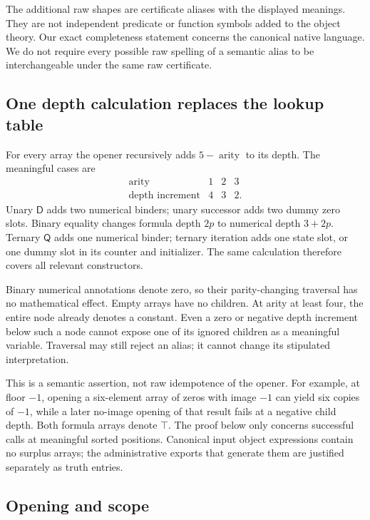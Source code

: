 \documentclass[11pt,letterpaper]{article}
\theoremstyle{definition}\newtheorem{definition}[theorem]{Definition}
\theoremstyle{remark}\newtheorem{remark}[theorem]{Remark}
\newcommand{\D}{\mathsf D}
\newcommand{\Q}{\mathsf Q}
\begin{document}
The additional raw shapes are certificate aliases with the displayed
meanings.  They are not independent predicate or function symbols added
to the object theory.  Our exact completeness statement concerns the
canonical native language.  We do not require every possible raw spelling
of a semantic alias to be interchangeable under the same raw certificate.

\subsection{One depth calculation replaces the lookup table}

For every array the opener recursively adds $5-\operatorname{arity}$
to its depth.  The meaningful cases are
\[
\begin{array}{c|ccc}
 \operatorname{arity}&1&2&3\\\hline
 \text{depth increment}&4&3&2.
\end{array}
\]
Unary $\D$ adds two numerical binders; unary successor adds two dummy
zero slots.  Binary equality changes formula depth $2p$ to numerical
depth $3+2p$.  Ternary $\Q$ adds one numerical binder; ternary iteration
adds one state slot, or one dummy slot in its counter and initializer.
The same calculation therefore covers all relevant constructors.

Binary numerical annotations denote zero, so their parity-changing
traversal has no mathematical effect.  Empty arrays have no children.
At arity at least four, the entire node already denotes a constant.
Even a zero or negative depth increment below such a node cannot expose
one of its ignored children as a meaningful variable.  Traversal may
still reject an alias; it cannot change its stipulated interpretation.

This is a semantic assertion, not raw idempotence of the opener.
For example, at floor $-1$, opening a six-element array of zeros with
image $-1$ can yield six copies of $-1$, while a later no-image opening
of that result fails at a negative child depth.  Both formula arrays
denote $\top$.  The proof below only concerns successful calls at meaningful
sorted positions.  Canonical input object expressions contain no surplus
arrays; the administrative exports that generate them are justified
separately as truth entries.

\subsection{Opening and scope}
\label{subsec:opening-lemma}
\end{document}
